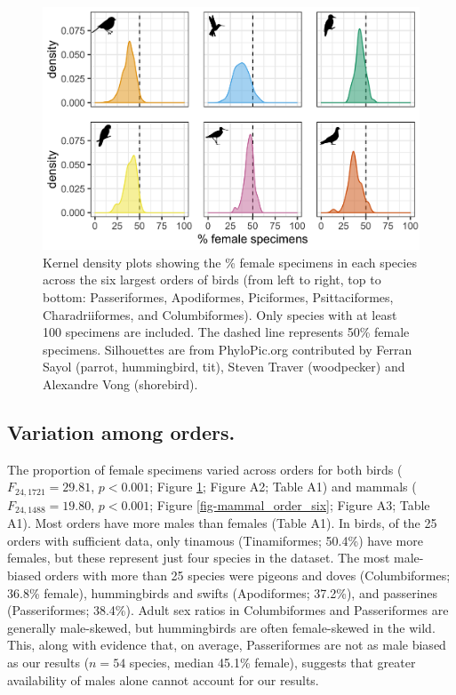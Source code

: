 \documentclass[a4paper, 12pt]{article}
\begin{document}
\begin{figure}
 \centering
  \includegraphics[width = \linewidth]{figures/orders-density-birds-six.png}
  \caption{Kernel density plots showing the \% female specimens in each species across the six largest orders of birds (from left to right, top to bottom: Passeriformes, Apodiformes, Piciformes, Psittaciformes, Charadriiformes, and Columbiformes). 
  Only species with at least 100 specimens are included. 
  The dashed line represents 50\% female specimens. 
  Silhouettes are from PhyloPic.org contributed by Ferran Sayol (parrot, hummingbird, tit), Steven Traver (woodpecker) and Alexandre Vong (shorebird).}
  \label{fig-bird_order_six}
\end{figure}

\subsection{Variation among orders.} 
The proportion of female specimens varied across orders for both birds ($F_{24, 1721} = 29.81$, $p < 0.001$; Figure \ref{fig-bird_order_six}; Figure A2; Table A1) and mammals ($F_{24, 1488} = 19.80$, $p < 0.001$; Figure \ref{fig-mammal_order_six}; Figure A3; Table A1). Most orders have more males than females (Table A1). 
In birds, of the 25 orders with sufficient data, only tinamous (Tinamiformes; 50.4\%) have more females, but these represent just four species in the dataset. 
The most male-biased orders with more than 25 species were pigeons and doves (Columbiformes; 36.8\% female), hummingbirds and swifts (Apodiformes; 37.2\%), and passerines (Passeriformes; 38.4\%). 
Adult sex ratios in Columbiformes and Passeriformes are generally male-skewed\cite{szekely2014sex,bosque2019skewed,mayr1939sex}, but hummingbirds are often female-skewed in the wild\cite{szekely2014sex,mayr1939sex}. 
This, along with evidence that, on average, Passeriformes are not as male biased as our results ($n = 54$ species, median 45.1\% female\cite{szekely2014sex}), suggests that greater availability of males alone cannot account for our results.
\end{document}
